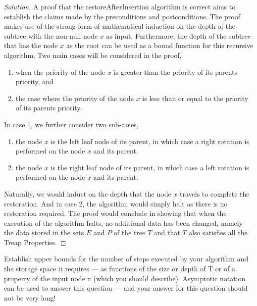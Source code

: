 \documentclass[12pt]{article}
\newenvironment{problem}[2][Problem]{\begin{trivlist}
\item[\hskip \labelsep {\bfseries #1}\hskip \labelsep {\bfseries #2.}]}{\end{trivlist}}
\newenvironment{solution}{\renewcommand\qedsymbol{$\blacksquare$}\begin{proof}[Solution]}{\end{proof}}
\begin{document}
\begin{solution}
    A proof that the restoreAfterInsertion algorithm is correct aims to establish the claims made by the preconditions and postconditions. The proof makes use of the strong form of mathematical induction on the depth of the subtree with the non-null node $x$ as input. Furthermore, the depth of the subtree that has the node $x$ as the root can be used as a bound function for this recursive algorithm. Two main cases will be considered in the proof, 

    \begin{enumerate}
        \item when the priority of the node $x$ is greater than the priority of its parents priority, and
        \item the case where the priority of the node $x$ is less than or equal to the priority of its parents priority.
    \end{enumerate}

    \noindent In case 1, we further consider two sub-cases,

    \begin{enumerate}
        \item the node $x$ is the left leaf node of its parent, in which case a right rotation is performed on the node $x$ and its parent. 
        \item the node $x$ is the right leaf node of its parent, in which case a left rotation is performed on the node $x$ and its parent.
    \end{enumerate}

    \noindent Naturally, we would induct on the depth that the node $x$ travels to complete the restoration. And in case 2, the algorithm would simply halt as there is no restoration required. The proof would conclude in showing that when the execution of the algorithm halts, no additional data has been changed, namely the data stored in the sets $E$ and $P$ of the tree $T$ and that $T$ also satisfies all the Treap Properties.

\end{solution}


\begin{problem}{5}
    Establish upper bounds for the number of steps executed by your algorithm and the storage space it requires — as functions of the size or depth of T or of a property of the input node x (which you should describe). Asymptotic notation can be used to answer this question — and your answer for this question should not be very long!
\end{problem}
\end{document}
